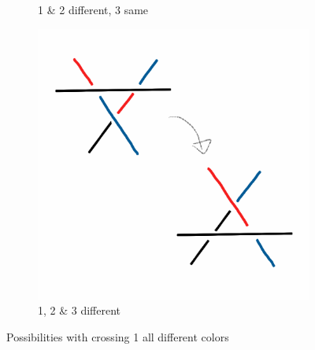 \documentclass[12pt,letterpaper]{article}
\theoremstyle{definition}
\begin{document}
\begin{figure}[h!]
\begin{subfigure}{.3\textwidth}
        \caption{1 \& 2 different, 3 same}
    \end{subfigure}
    \quad
    \begin{subfigure}{.3\textwidth}
        \centering
        \includegraphics[width=\textwidth]{knotpics/1d2d3d.png}
        \caption{1, 2 \& 3 different}
    \end{subfigure}
    \caption{Possibilities with crossing 1 all different colors}
\end{figure}
\end{document}
